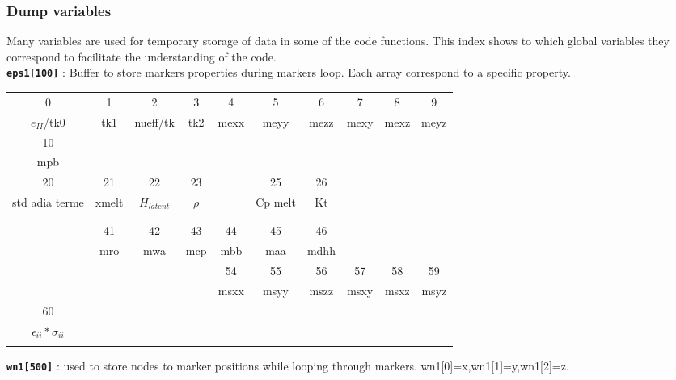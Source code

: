 \subsubsection{Dump variables}
Many variables are used for temporary storage of data in some of the code functions. This index shows to which global variables they correspond to facilitate the understanding of the code. \\

\textbf{\texttt{eps1[100]}} : Buffer to store markers properties during markers loop. Each array correspond to a specific property. \\

\begin{tabular}{c c c c c c c c c c}
\hline
 0       & 1   & 2        & 3   & 4    &  5   & 6    & 7    &  8   & 9  \\ 
 $e_{II}$/tk0 & tk1 & nueff/tk & tk2 & mexx & meyy & mezz & mexy & mexz & meyz \\
\hline
10  & & & & & & & & &   \\ 
mpb & & & & & & & & &   \\
\hline
20             & 21    & 22           & 23     & & 25      & 26 & & & \\
std adia terme & xmelt & $H_{latent}$ & $\rho$ & & Cp melt & Kt & & & \\
\hline
   & & & & & & & & & \\ 
   & & & & & & & & & \\
\hline 
     & 41  & 42  & 43  & 44  & 45  & 46   & & & \\ 
     & mro & mwa & mcp & mbb & maa & mdhh & & & \\
\hline
 & & & & 54   & 55   & 56   & 57   & 58   & 59 \\ 
 & & & & msxx & msyy & mszz & msxy & msxz & msyz \\
\hline 
 60 & & & & & & & & &  \\ 
 $\epsilon_{ii}*\sigma_{ii} $ & & & & & & & & &  \\
\hline
\label{marktable2}
\end{tabular}

\textbf{\texttt{wn1[500]}} : used to store nodes to marker positions while looping through markers. wn1[0]=x,wn1[1]=y,wn1[2]=z. \\

